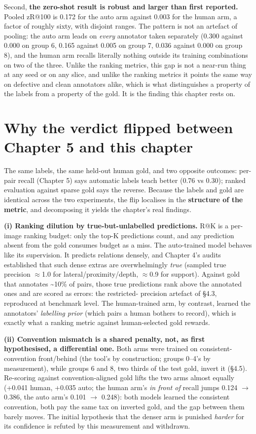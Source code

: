 Second, \textbf{the zero-shot result is robust and larger than first reported.} Pooled zR@100 is 0.172 for the auto arm against 0.003 for the human arm, a factor of roughly sixty, with disjoint ranges. The pattern is not an artefact of pooling: the auto arm leads on \textit{every} annotator taken separately (0.300 against 0.000 on group 6, 0.165 against 0.005 on group 7, 0.036 against 0.000 on group 8), and the human arm recalls literally nothing outside its training combinations on two of the three. Unlike the ranking metrics, this gap is not a near-run thing at any seed or on any slice, and unlike the ranking metrics it points the same way on defective and clean annotators alike, which is what distinguishes a property of the labels from a property of the gold. It is the finding this chapter rests on.

\section{Why the verdict flipped between Chapter 5 and this chapter}

The same labels, the same held-out human gold, and two opposite outcomes: per-pair recall (Chapter 5) says automatic labels teach better (0.76 vs 0.30); ranked evaluation against sparse gold says the reverse. Because the labels and gold are identical across the two experiments, the flip localises in the \textbf{structure of the metric}, and decomposing it yields the chapter's real findings.

\textbf{(i) Ranking dilution by true-but-unlabelled predictions.} R@K is a per-image ranking budget: only the top-K predictions count, and any prediction absent from the gold consumes budget as a miss. The auto-trained model behaves like its supervision. It predicts relations densely, and Chapter 4's audits established that such dense extras are overwhelmingly \textit{true} (sampled true precision $\approx$1.0 for lateral/proximity/depth, $\approx$0.9 for support). Against gold that annotates \textasciitilde{}10\% of pairs, those true predictions rank above the annotated ones and are scored as errors: the restricted- precision artefact of \S4.3, reproduced at benchmark level. The human-trained arm, by contrast, learned the annotators' \textit{labelling prior} (which pairs a human bothers to record), which is exactly what a ranking metric against human-selected gold rewards.

\textbf{(ii) Convention mismatch is a shared penalty, not, as first hypothesised, a differential one.} Both arms were trained on consistent-convention front/behind (the tool's by construction; groups 0--4's by measurement), while groups 6 and 8, two thirds of the test gold, invert it (\S4.5). Re-scoring against convention-aligned gold lifts the two arms almost equally (+0.041 human, +0.035 auto; the human arm's \textit{in front of} recall jumps 0.124 $\rightarrow$ 0.386, the auto arm's 0.101 $\rightarrow$ 0.248): both models learned the consistent convention, both pay the same tax on inverted gold, and the gap between them barely moves. The initial hypothesis that the denser arm is punished \textit{harder} for its confidence is refuted by this measurement and withdrawn.

